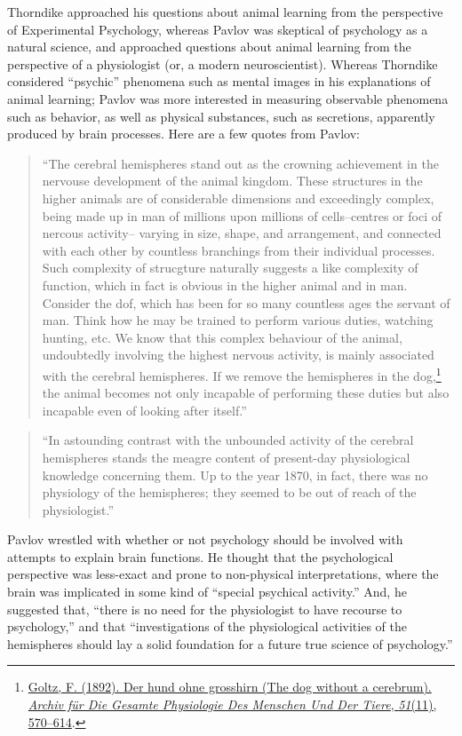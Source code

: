 \documentclass[
  oneside,
  12pt]{crumpbook}
\begin{document}
Thorndike approached his questions about animal learning from the perspective of Experimental Psychology, whereas Pavlov was skeptical of psychology as a natural science, and approached questions about animal learning from the perspective of a physiologist (or, a modern neuroscientist). Whereas Thorndike considered ``psychic'' phenomena such as mental images in his explanations of animal learning; Pavlov was more interested in measuring observable phenomena such as behavior, as well as physical substances, such as secretions, apparently produced by brain processes. Here are a few quotes from Pavlov:

\begin{quote}
``The cerebral hemispheres stand out as the crowning achievement in the nervouse development of the animal kingdom. These structures in the higher animals are of considerable dimensions and exceedingly complex, being made up in man of millions upon millions of cells--centres or foci of nercous activity-- varying in size, shape, and arrangement, and connected with each other by countless branchings from their individual processes. Such complexity of strucgture naturally suggests a like complexity of function, which in fact is obvious in the higher animal and in man. Consider the dof, which has been for so many countless ages the servant of man. Think how he may be trained to perform various duties, watching hunting, etc. We know that this complex behaviour of the animal, undoubtedly involving the highest nervous activity, is mainly associated with the cerebral hemispheres. If we remove the hemispheres in the dog,\footnote{\protect\hyperlink{ref-goltzHundOhneGrosshirn1892}{Goltz, F. (1892). Der hund ohne grosshirn ({The} dog without a cerebrum). \emph{Archiv für Die Gesamte Physiologie Des Menschen Und Der Tiere}, \emph{51}(11), 570--614}.} the animal becomes not only incapable of performing these duties but also incapable even of looking after itself.''
\end{quote}

\begin{quote}
``In astounding contrast with the unbounded activity of the cerebral hemispheres stands the meagre content of present-day physiological knowledge concerning them. Up to the year 1870, in fact, there was no physiology of the hemispheres; they seemed to be out of reach of the physiologist.''
\end{quote}

Pavlov wrestled with whether or not psychology should be involved with attempts to explain brain functions. He thought that the psychological perspective was less-exact and prone to non-physical interpretations, where the brain was implicated in some kind of ``special psychical activity.'' And, he suggested that, ``there is no need for the physiologist to have recourse to psychology,'' and that ``investigations of the physiological activities of the hemispheres should lay a solid foundation for a future true science of psychology.''
\end{document}
